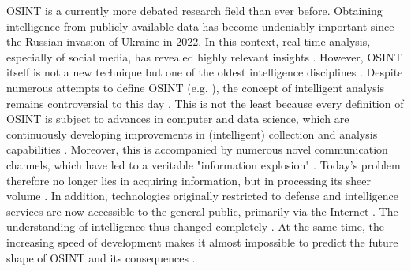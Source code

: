 \documentclass[10pt]{article}
\begin{document}
OSINT is a currently more debated research field than ever before. Obtaining intelligence from publicly available data \cite{DosPassos.2017} has become undeniably important since the Russian invasion of Ukraine in 2022. In this context, real-time analysis, especially of social media, has revealed highly relevant insights \cite{Hatfield.2023, SmithBoyle.24.07.2023}. However, OSINT itself is not a new technique \cite{PastorGalindo.2019,Schaurer.2010} but one of the oldest intelligence disciplines \cite{Burke.2007}. Despite numerous attempts to define OSINT (e.g. \cite{Hwang.2022,PastorGalindo.2020,Yogish.2021}), the concept of intelligent analysis remains controversial to this day \cite{Ghioni.2023,Ish.2022,Williams.2018}. This is not the least because every definition of OSINT is subject to advances in computer and data science, which are continuously developing improvements in (intelligent) collection and analysis capabilities \cite{Ghioni.2023,Williams.2018}. Moreover, this is accompanied by numerous novel communication channels, which have led to a veritable "information explosion" \cite{DosPassos.2017, Hwang.2022, Yogish.2021}. Today's problem therefore no longer lies in acquiring information, but in processing its sheer volume \cite{Burke.2007}. In addition, technologies originally restricted to defense and intelligence services are now accessible to the general public, primarily via the Internet \cite{Hwang.2022, Williams.2018}. The understanding of intelligence thus changed completely \cite{Dokman.2020}. At the same time, the increasing speed of development makes it almost impossible to predict the future shape of OSINT and its consequences \cite{Benes.2013}.
\end{document}
